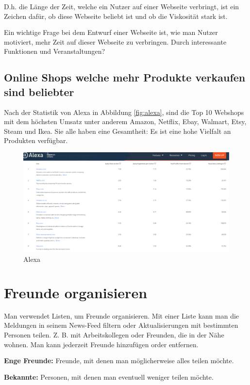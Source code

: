 D.h. die Länge der Zeit, welche ein Nutzer auf einer Webseite verbringt, ist ein Zeichen dafür, ob diese Webseite beliebt ist und ob die Viskosität stark ist.

Ein wichtige Frage bei dem Entwurf einer Webseite ist, wie man Nutzer motiviert, mehr Zeit auf dieser Webseite zu verbringen. Durch interessante Funktionen und Veranstaltungen?


\subsection{Online Shops welche mehr Produkte verkaufen sind beliebter}

Nach der Statistik von Alexa in Abbildung \vref{fig:alexa}, sind die Top 10 Webshops mit dem höchsten Umsatz unter anderem Amazon, Netflix, Ebay, Walmart, Etsy, Steam und Ikea. Sie alle haben eine Gesamtheit: Es ist eine hohe Vielfalt an Produkten verfügbar.

\begin{figure}
	\centering
	\includegraphics[width=1\textwidth]{bilder/alexa.png}
	\caption{Alexa}
	\label{fig:alexa}
\end{figure}


\section{Freunde organisieren}

Man verwendet Listen, um  Freunde organisieren. Mit einer Liste kann man die Meldungen in seinem News-Feed filtern oder Aktualisierungen mit bestimmten Personen teilen. Z. B. mit Arbeitskollegen oder Freunden, die in der Nähe wohnen. Man kann jederzeit Freunde hinzufügen order entfernen. \parencite{facebook:help}

\textbf{Enge Freunde:} Freunde, mit denen man möglicherweise alles teilen möchte.

\textbf{Bekannte:} Personen, mit denen man eventuell weniger teilen möchte.

